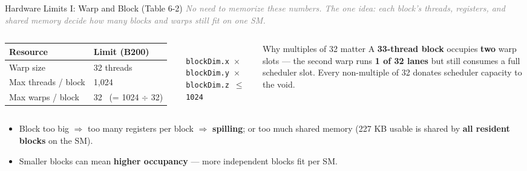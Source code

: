 \documentclass[aspectratio=169]{beamer}
\newcommand{\kw}[1]{\textbf{\textcolor{kwblue}{#1}}}
\newcommand{\bridge}[1]{{\footnotesize\itshape\textcolor{gray}{#1}}\par}
\begin{document}
\begin{frame}{Hardware Limits I: Warp and Block (Table 6-2)}
  \bridge{No need to memorize these numbers. The one idea: each block's threads, registers, and shared memory decide how many blocks and warps still fit on one SM.}
  \begin{columns}[c]
    {\small
    \begin{tabular}{@{}ll@{}}
      \toprule
      \textbf{Resource} & \textbf{Limit (B200)} \\
      \midrule
      Warp size & 32 threads \\
      Max threads / block & 1{,}024 \\
      Max warps / block & 32 \ (= 1024 $\div$ 32) \\
      \bottomrule
    \end{tabular}}\\[6pt]
    {\scriptsize \texttt{blockDim.x $\times$ blockDim.y $\times$ blockDim.z $\leq$ 1024}}
    \begin{block}{Why multiples of 32 matter}
      \small A \kw{33-thread block} occupies \kw{two} warp slots --- the second warp runs
      \kw{1 of 32 lanes} but still consumes a full scheduler slot. Every non-multiple of 32
      donates scheduler capacity to the void.
    \end{block}
  \end{columns}
  \medskip
  \begin{itemize}
    \item Block too big $\Rightarrow$ too many registers per block $\Rightarrow$ \kw{spilling};
          or too much shared memory (227 KB usable is shared by \kw{all resident blocks} on the SM).
    \item Smaller blocks can mean \kw{higher occupancy} --- more independent blocks fit per SM.
  \end{itemize}
\end{frame}
\end{document}
